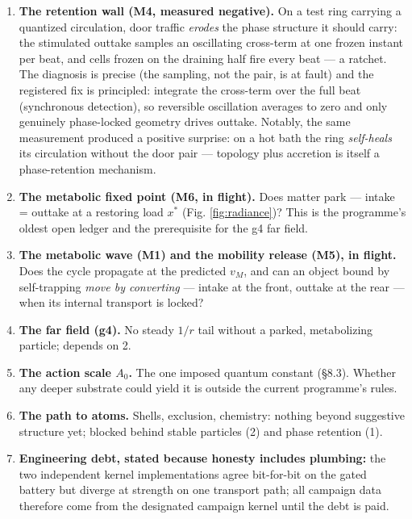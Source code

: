 \begin{enumerate}
\def\labelenumi{\arabic{enumi}.}
\tightlist
\item
  \textbf{The retention wall (M4, measured negative).} On a test ring
  carrying a quantized circulation, door traffic \emph{erodes} the phase
  structure it should carry: the stimulated outtake samples an
  oscillating cross-term at one frozen instant per beat, and cells
  frozen on the draining half fire every beat --- a ratchet. The
  diagnosis is precise (the sampling, not the pair, is at fault) and the
  registered fix is principled: integrate the cross-term over the full
  beat (synchronous detection), so reversible oscillation averages to
  zero and only genuinely phase-locked geometry drives outtake. Notably,
  the same measurement produced a positive surprise: on a hot bath the
  ring \emph{self-heals} its circulation without the door pair ---
  topology plus accretion is itself a phase-retention mechanism.
\item
  \textbf{The metabolic fixed point (M6, in flight).} Does matter park
  --- intake = outtake at a restoring load \(x^*\) (Fig.
  \ref{fig:radiance})? This is the programme's oldest open ledger and
  the prerequisite for the g4 far field.
\item
  \textbf{The metabolic wave (M1) and the mobility release (M5), in
  flight.} Does the cycle propagate at the predicted \(v_M\), and can an
  object bound by self-trapping \emph{move by converting} --- intake at
  the front, outtake at the rear --- when its internal transport is
  locked?
\item
  \textbf{The far field (g4).} No steady \(1/r\) tail without a parked,
  metabolizing particle; depends on 2.
\item
  \textbf{The action scale \(A_0\).} The one imposed quantum constant
  (§8.3). Whether any deeper substrate could yield it is outside the
  current programme's rules.
\item
  \textbf{The path to atoms.} Shells, exclusion, chemistry: nothing
  beyond suggestive structure yet; blocked behind stable particles (2)
  and phase retention (1).
\item
  \textbf{Engineering debt, stated because honesty includes plumbing:}
  the two independent kernel implementations agree bit-for-bit on the
  gated battery but diverge at strength on one transport path; all
  campaign data therefore come from the designated campaign kernel until
  the debt is paid.
\end{enumerate}

